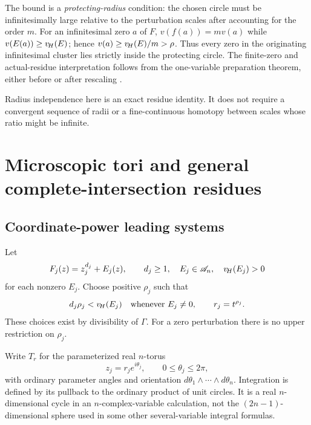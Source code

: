 \documentclass[11pt,letterpaper]{article}
\theoremstyle{definition}
\theoremstyle{remark}
\numberwithin{equation}{section}
\begin{document}
The bound is a \emph{protecting-radius} condition: the chosen circle must be infinitesimally large relative to the perturbation scales after accounting for the order $m$. For an infinitesimal zero $a$ of $F$, $v(f(a))=m v(a)$ while $v(E(a))\ge v_{\!H}(E)$; hence $v(a)\ge v_{\!H}(E)/m>\rho$. Thus every zero in the originating infinitesimal cluster lies strictly inside the protecting circle. The finite-zero and actual-residue interpretation follows from the one-variable preparation theorem, either before or after rescaling \cite{Analysis,Geometry}.

Radius independence here is an exact residue identity. It does not require a convergent sequence of radii or a fine-continuous homotopy between scales whose ratio might be infinite.

\section{Microscopic tori and general complete-intersection residues}\label{sec:multi}

\subsection{Coordinate-power leading systems}
Let
\begin{equation}\label{eq:powerleading}
 F_j(z)=z_j^{d_j}+E_j(z),\qquad d_j\ge1,\quad E_j\in\mathscr A_n,
 \quad v_{\!H}(E_j)>0
\end{equation}
for each nonzero $E_j$. Choose positive $\rho_j$ such that
\begin{equation}\label{eq:protecting}
 d_j\rho_j<v_{\!H}(E_j)\quad\text{whenever }E_j\ne0,
 \qquad r_j=t^{\rho_j}.
\end{equation}
These choices exist by divisibility of $\Gamma$. For a zero perturbation there is no upper restriction on $\rho_j$.

Write $T_r$ for the parameterized real $n$-torus
\[
 z_j=r_je^{i\theta_j},\qquad 0\le\theta_j\le2\pi,
\]
with ordinary parameter angles and orientation $d\theta_1\wedge\cdots\wedge d\theta_n$. Integration is defined by its pullback to the ordinary product of unit circles. It is a real $n$-dimensional cycle in an $n$-complex-variable calculation, not the $(2n-1)$-dimensional sphere used in some other several-variable integral formulas.
\end{document}
